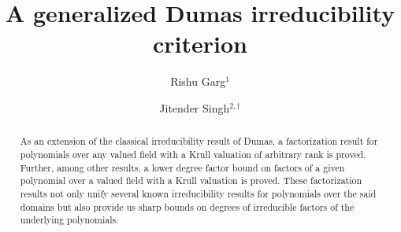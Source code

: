 \documentclass[12pt]{amsart}%
\begin{document}
\newtheorem{theorem}{Theorem}
\newtheorem{corollary}[theorem]{Corollary}
\newtheorem{lemma}[theorem]{Lemma}
\theoremstyle{definition}
\newtheorem{example}{\bf Example}
\theoremstyle{theorem}
\newtheorem{conjecture}[theorem]{Conjecture}
\newtheorem{thmx}{\bf Theorem}
\renewcommand{\thethmx}{\text{\Alph{thmx}}}%
\newtheorem{lemmax}{\bf Lemma}
\renewcommand{\thelemmax}{\text{\Alph{lemmax}}}%
\hoffset=-0cm
\theoremstyle{definition}
\newtheorem*{definition}{Definition}
\theoremstyle{remark}
\newtheorem*{remark}{\bf Remark}
\theoremstyle{remark}
\newtheorem*{remarks}{\bf Remarks}
\parindent=0cm
\title{\bf A generalized Dumas irreducibility criterion}
\author{Rishu Garg$^{1}$ {\large {}}}
\author{Jitender Singh$^{2,\dagger}$ {\large {}}}
\address[1,2]{Department of Mathematics,
Guru Nanak Dev University, Amritsar-143005, India\newline %
{\tt rishugarg128@gmail.com}, {\tt jitender.math@gndu.ac.in}}

\markright{}
\date{}
\maketitle
\newcommand{\K}{\mathbb{K}}
\newcommand{\dd}{\Gamma^{\text{div}}}
\newcommand{\dv}{G_v^{\text{div}}}
\begin{abstract}
As an extension of the classical irreducibility result of Dumas, a factorization result for polynomials over any valued field with a Krull valuation of arbitrary rank is proved. Further, among other results, a lower degree factor bound on factors of a given polynomial over a valued field with a Krull valuation is proved. These factorization results not only unify several known irreducibility results for polynomials over the said domains but also provide us sharp bounds on degrees of irreducible factors of the underlying polynomials.
\end{abstract}
\end{document}
